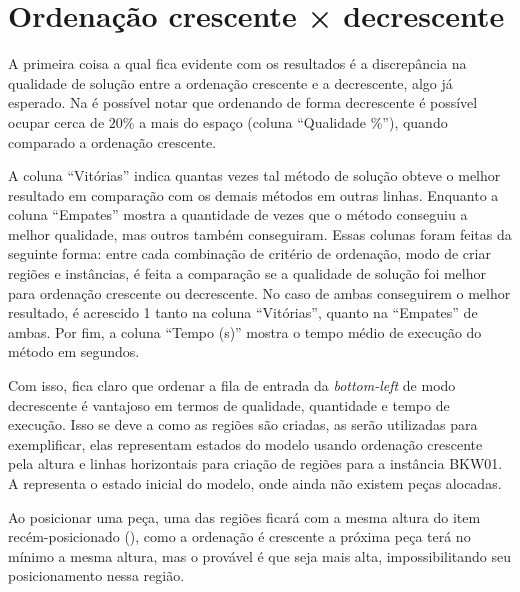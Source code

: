 \section{Ordenação crescente × decrescente}\label{sec:ordenacao-crescente-decrescente}

A primeira coisa a qual fica evidente com os resultados é a discrepância na qualidade de solução
entre a ordenação crescente e a decrescente, algo já esperado.
Na  é possível notar que ordenando de forma decrescente é possível ocupar
cerca de $20\%$ a mais do espaço (coluna “Qualidade \%”), quando comparado a ordenação crescente.



A coluna “Vitórias” indica quantas vezes tal método de solução obteve o melhor resultado em
comparação com os demais métodos em outras linhas.
Enquanto a coluna “Empates” mostra a quantidade de vezes que o método conseguiu a melhor qualidade,
mas outros também conseguiram.
Essas colunas foram feitas da seguinte forma: entre cada combinação de critério de ordenação,
modo de criar regiões e instâncias, é feita a comparação se a qualidade de solução foi melhor
para ordenação crescente ou decrescente.
No caso de ambas conseguirem o melhor resultado, é acrescido 1 tanto na coluna “Vitórias”, quanto
na “Empates” de ambas.
Por fim, a coluna “Tempo (s)” mostra o tempo médio de execução do método em segundos.

Com isso, fica claro que ordenar a fila de entrada da \textit{bottom-left} de modo decrescente é
vantajoso em termos de qualidade, quantidade e tempo de execução.
Isso se deve a como as regiões são criadas,
as  serão utilizadas para exemplificar,
elas representam estados do modelo usando ordenação crescente pela altura e linhas horizontais
para criação de regiões para a instância BKW01.
A  representa o estado inicial do modelo, onde ainda não existem peças
alocadas.



Ao posicionar uma peça, uma das regiões ficará com a mesma altura do item recém-posicionado
(), como a ordenação é crescente a próxima peça terá no mínimo a mesma altura,
mas o provável é que seja mais alta, impossibilitando seu posicionamento nessa região.

